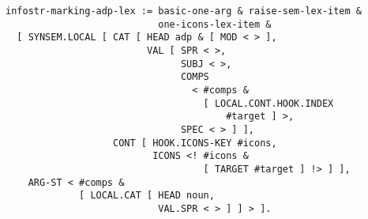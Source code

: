 \documentclass[a4paper]{article}
\begin{document}
{\small\begin{verbatim}
infostr-marking-adp-lex := basic-one-arg & raise-sem-lex-item & 
                           one-icons-lex-item &
  [ SYNSEM.LOCAL [ CAT [ HEAD adp & [ MOD < > ],
                         VAL [ SPR < >,
                               SUBJ < >,
                               COMPS 
                                 < #comps &
                                   [ LOCAL.CONT.HOOK.INDEX 
                                       #target ] >,
                               SPEC < > ] ],
                   CONT [ HOOK.ICONS-KEY #icons,
                          ICONS <! #icons & 
                                   [ TARGET #target ] !> ] ],
    ARG-ST < #comps &
             [ LOCAL.CAT [ HEAD noun,
                           VAL.SPR < > ] ] > ].
\end{verbatim}}
\end{document}
